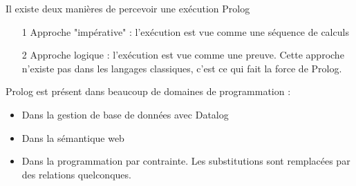 Il existe deux manières de percevoir une exécution Prolog

\begin{itemize}
\item[1] Approche "impérative" : l'exécution est vue comme une séquence de calculs
\item[2] Approche logique : l'exécution est vue comme une preuve. Cette approche n'existe pas dans les langages classiques, c'est ce qui fait la force de Prolog.
\end{itemize}

Prolog est présent dans beaucoup de domaines de programmation :

\begin{itemize}
\item Dans la gestion de base de données avec Datalog
\item Dans la sémantique web
\item Dans la programmation par contrainte. Les substitutions sont remplacées par des relations quelconques.
\end{itemize}

